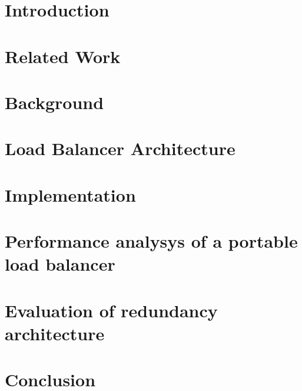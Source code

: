 
\chapter{Introduction}\label{chapter:introduction}
\graphicspath{{Manuscript/}}


\chapter{Related Work}\label{chapter:related}
\graphicspath{{Manuscript/}}


\chapter{Background}\label{chapter:background}
\graphicspath{{Manuscript/}}


\chapter{Load Balancer Architecture}\label{chapter:architecture}
\graphicspath{{Manuscript/}}


\chapter{Implementation}\label{chapter:implemetation}
\graphicspath{{Manuscript/}}


\chapter{Performance analysys of a portable load balancer}\label{chapter:evaluation}
\graphicspath{{./}}


\chapter{Evaluation of redundancy architecture}\label{chapter:evaluation}
\graphicspath{{Manuscript/}}


\chapter{Conclusion}\label{chapter:conclusion}
\graphicspath{{Manuscript/}}


